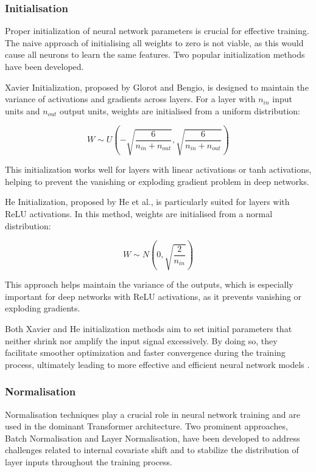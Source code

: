 \documentclass[a4paper, oneside]{discothesis}
\begin{document}
\subsubsection{Initialisation}

Proper initialization of neural network parameters is crucial for effective training. The naive approach of initialising all weights to zero is not viable, as this would cause all neurons to learn the same features. Two popular initialization methods have been developed.

Xavier Initialization, proposed by Glorot and Bengio, is designed to maintain the variance of activations and gradients across layers. For a layer with $n_{in}$ input units and $n_{out}$ output units, weights are initialised from a uniform distribution:

\begin{equation}
    W \sim U\left(-\sqrt{\frac{6}{n_{in} + n_{out}}}, \sqrt{\frac{6}{n_{in} + n_{out}}}\right)
\end{equation}

This initialization works well for layers with linear activations or tanh activations, helping to prevent the vanishing or exploding gradient problem in deep networks.

He Initialization, proposed by He et al., is particularly suited for layers with ReLU activations. In this method, weights are initialised from a normal distribution:

\begin{equation}
    W \sim N\left(0, \sqrt{\frac{2}{n_{in}}}\right)
\end{equation}

This approach helps maintain the variance of the outputs, which is especially important for deep networks with ReLU activations, as it prevents vanishing or exploding gradients.

Both Xavier and He initialization methods aim to set initial parameters that neither shrink nor amplify the input signal excessively. By doing so, they facilitate smoother optimization and faster convergence during the training process, ultimately leading to more effective and efficient neural network models \cite{glorot2010understanding, he2015delving}.

\subsubsection{Normalisation}

Normalisation techniques play a crucial role in neural network training and are used in the dominant Transformer architecture. Two prominent approaches, Batch Normalisation and Layer Normalisation, have been developed to address challenges related to internal covariate shift and to stabilize the distribution of layer inputs throughout the training process.
\end{document}
